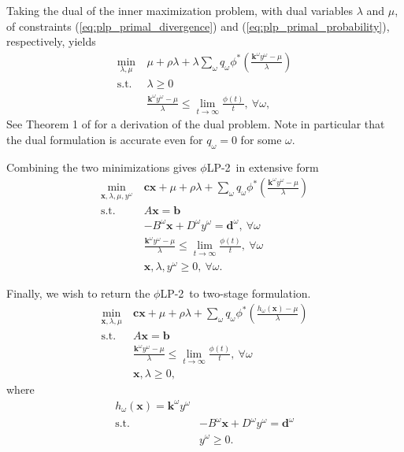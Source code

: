 \documentclass[ijoc,letterpaper]{informs3} %
\newcommand{\x}{\mathbf{x}}
\renewcommand{\c}{\mathbf{c}}
\renewcommand{\k}{\mathbf{k}}
\renewcommand{\b}{\mathbf{b}}
\renewcommand{\d}{\mathbf{d}}
\newcommand{\st}{\mbox{s.t.}}
\newcommand{\plp}{$\phi$LP-2}
\begin{document}
Taking the dual of the inner maximization problem, with dual variables $\lambda$ and $\mu$, of constraints (\ref{eq:plp_primal_divergence}) and (\ref{eq:plp_primal_probability}), respectively, yields
\begin{align*}
	\min_{\lambda,\mu} \ & \mu + \rho \lambda + \lambda \sum_\omega q_\omega \phi^*\left(\frac{\k^\omega y^\omega - \mu}{\lambda}\right) \\
	\st \ & \lambda \geq 0 \\
	& \frac{\k^\omega y^\omega - \mu}{\lambda} \leq \lim_{t \rightarrow \infty} \frac{\phi(t)}{t}, \ \forall \omega,
\end{align*}
See Theorem 1 of \cite{bental2011robust} for a derivation of the dual problem.
Note in particular that the dual formulation is accurate even for $q_\omega = 0$ for some $\omega$.

Combining the two minimizations gives \plp\ in extensive form
\begin{align}
	\min_{\x,\lambda,\mu,y^\omega} \ & \c\x + \mu + \rho \lambda + \sum_\omega q_\omega \phi^*\left(\frac{\k^\omega y^\omega - \mu}{\lambda}\right) \nonumber \\
	\st \ & A\x = \b \nonumber \\
	& -B^\omega \x + D^\omega y^\omega = \d^\omega,\ \forall \omega \label{eq:plp_det_equiv} \\
	& \frac{\k^\omega y^\omega - \mu}{\lambda} \leq \lim_{t \rightarrow \infty} \frac{\phi(t)}{t}, \ \forall \omega \nonumber \\
	& \x,\lambda,y^\omega \geq 0, \ \forall \omega. \nonumber
\end{align}

Finally, we wish to return the \plp\ to two-stage formulation.
\begin{align}
	\min_{\x,\lambda,\mu} \ & \c\x + \mu + \rho \lambda + \sum_\omega q_\omega \phi^*\left(\frac{h_\omega(\x) - \mu}{\lambda}\right) \nonumber \\
	\st \ & A\x = \b \label{eq:plp_two_stage} \\
	& \frac{\k^\omega y^\omega - \mu}{\lambda} \leq \lim_{t \rightarrow \infty} \frac{\phi(t)}{t}, \ \forall \omega \label{eq:plp_feas_constraint}\\
	& \x,\lambda \geq 0, \nonumber
\end{align}
where
\begin{align}
	h_\omega(\x) = \k^\omega y^\omega \label{eq:plp_second_stage} \\
	\st \ & -B^\omega \x + D^\omega y^\omega = \d^\omega \nonumber \\
	& y^\omega \geq 0. \nonumber
\end{align}
\end{document}
